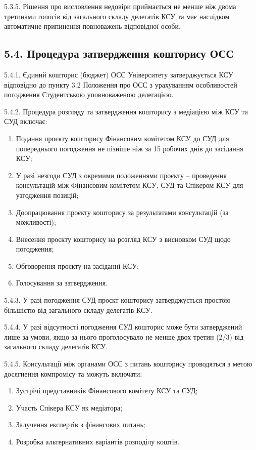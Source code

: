     5.3.5. Рішення про висловлення недовіри приймається не менше ніж двома третинами голосів від загального складу делегатів КСУ та має наслідком автоматичне припинення повноважень відповідної особи.

\subsection*{5.4. Процедура затвердження кошторису ОСС}
    5.4.1. Єдиний кошторис (бюджет) ОСС Університету затверджується КСУ відповідно до пункту 3.2 Положення про ОСС з урахуванням особливостей погодження Студентською уповноваженою делегацією.

    5.4.2. Процедура розгляду та затвердження кошторису з медіацією між КСУ та СУД включає:

        \begin{enumerate}[label=\alph*)]
            \item Подання проєкту кошторису Фінансовим комітетом КСУ до СУД для попереднього погодження не пізніше ніж за 15 робочих днів до засідання КСУ;
            \item У разі незгоди СУД з окремими положеннями проєкту -- проведення консультацій між Фінансовим комітетом КСУ, СУД та Спікером КСУ для узгодження позицій;
            \item Доопрацювання проєкту кошторису за результатами консультацій (за можливості);
            \item Внесення проєкту кошторису на розгляд КСУ з висновком СУД щодо погодження;
            \item Обговорення проєкту на засіданні КСУ;
            \item Голосування за затвердження.
        \end{enumerate}

    5.4.3. У разі погодження СУД проєкт кошторису затверджується простою більшістю від загального складу делегатів КСУ.

    5.4.4. У разі відсутності погодження СУД кошторис може бути затверджений лише за умови, якщо за нього проголосувало не менше двох третин (2/3) від загального складу делегатів КСУ.

    5.4.5. Консультації між органами ОСС з питань кошторису проводяться з метою досягнення компромісу та можуть включати:

        \begin{enumerate}[label=\alph*)]
            \item Зустрічі представників Фінансового комітету КСУ та СУД;
            \item Участь Спікера КСУ як медіатора;
            \item Залучення експертів з фінансових питань;
            \item Розробка альтернативних варіантів розподілу коштів.
        \end{enumerate}

